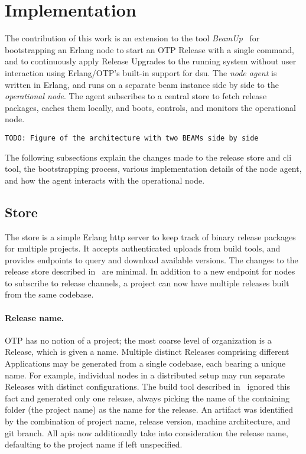 \section{Implementation}

The contribution of this work is an extension to the tool \emph{BeamUp}~\cite{zak18} for bootstrapping an Erlang node to start an OTP Release with a single command, and to continuously apply Release Upgrades to the running system without user interaction using Erlang/OTP's built-in support for \acrshort{dsu}. The \emph{node agent} is written in Erlang, and runs on a separate \acrshort{beam} instance side by side to the \emph{operational node}. The agent subscribes to a central store to fetch release packages, caches them locally, and boots, controls, and monitors the operational node.

\lstinline|TODO: Figure of the architecture with two BEAMs side by side|

The following subsections explain the changes made to the release store and \acrshort{cli} tool, the bootstrapping process, various implementation details of the node agent, and how the agent interacts with the operational node.

\cleardoublepage
\subsection{Store}

The store is a simple Erlang \acrshort{http} server to keep track of binary release packages for multiple projects. It accepts authenticated uploads from build tools, and provides endpoints to query and download available versions. The changes to the release store described in~\cite{zak18} are minimal. In addition to a new endpoint for nodes to subscribe to release channels, a project can now have multiple releases built from the same codebase.

\paragraph{Release name.}
OTP has no notion of a project; the most coarse level of organization is a Release, which is given a name. Multiple distinct Releases comprising different Applications may be generated from a single codebase, each bearing a unique name. For example, individual nodes in a distributed setup may run separate Releases with distinct configurations. The build tool described in~\cite{zak18} ignored this fact and generated only one release, always picking the name of the containing folder (the project name) as the name for the release. An artifact was identified by the combination of project name, release version, machine architecture, and git branch. All \acrshort{api}s now additionally take into consideration the release name, defaulting to the project name if left unspecified.


